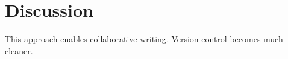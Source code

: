 \section{Discussion}
This approach enables collaborative writing.
Version control becomes much cleaner.